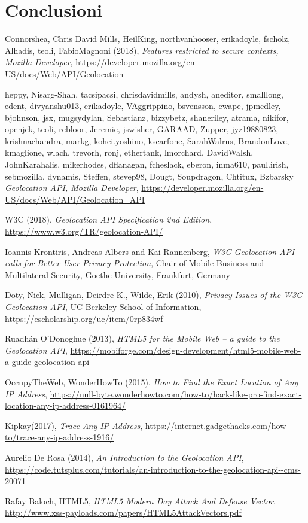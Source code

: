 \documentclass[11pt ,a4paper , twoside , openright ]{article}
\begin{document}
\section{Conclusioni}
\newpage
\listoffigures
\newpage
\begin{thebibliography}{99}
	\bibitem{}
	 Connorshea, Chris David Mills, HeilKing, northvanhooser, erikadoyle, fscholz, Alhadis, teoli, FabioMagnoni (2018),
	 \emph{Features restricted to secure contexts, Mozilla Developer},
	\url{https://developer.mozilla.org/en-US/docs/Web/API/Geolocation}
	
	\bibitem{}
	heppy, Nisarg-Shah, tacsipacsi, chrisdavidmills, andysh, aneditor, smalllong, edent, divyanshu013, erikadoyle, VAggrippino, bsvensson, ewape, jpmedley, bjohnson, jsx, mugsydylan, Sebastianz, bizzybetz, shaneriley, atrama, nikifor, openjck, teoli, rebloor, Jeremie, jswisher, GARAAD, Zupper, jyz19880823, krishnachandra, markg, kohei.yoshino, kscarfone, SarahWalrus, BrandonLove, kmaglione, wlach, trevorh, ronj, ethertank, lmorchard, DavidWalsh, JohnKarahalis, mikerhodes, dflanagan, fcheslack, eberon, inma610, paul.irish, sebmozilla, dynamis, Steffen, stevep98, Dougt, Soupdragon, Chtitux, Bzbarsky
	\emph{Geolocation API, Mozilla Developer},
	\url{https://developer.mozilla.org/en-US/docs/Web/API/Geolocation_API}
	
	\bibitem{}
	W3C (2018), 
	\emph{Geolocation API Specification 2nd Edition},
	\url{https://www.w3.org/TR/geolocation-API/}
	
	\bibitem{}
	Ioannis Krontiris, Andreas Albers and Kai Rannenberg,
	\emph{W3C Geolocation API calls for
		Better User Privacy Protection}, 
	Chair of Mobile Business and Multilateral Security, Goethe University, Frankfurt, Germany
	
	\bibitem{}
	Doty, Nick, Mulligan, Deirdre K., Wilde, Erik (2010),
	\emph{Privacy Issues of the W3C Geolocation API}, UC Berkeley School of Information, \url{https://escholarship.org/uc/item/0rp834wf}
	
	\bibitem{}
	Ruadhán O'Donoghue (2013),
	\emph{HTML5 for the Mobile Web – a guide to the Geolocation API}, \url{https://mobiforge.com/design-development/html5-mobile-web-a-guide-geolocation-api}

	\bibitem{}
	OccupyTheWeb, WonderHowTo (2015),
	\emph{How to Find the Exact Location of Any IP Address}, \url{https://null-byte.wonderhowto.com/how-to/hack-like-pro-find-exact-location-any-ip-address-0161964/}
	
	\bibitem{}
	Kipkay(2017), 
	\emph{Trace Any IP Address}, \url{https://internet.gadgethacks.com/how-to/trace-any-ip-address-1916/}
	
	\bibitem{}
	Aurelio De Rosa (2014),
	\emph{An Introduction to the Geolocation API},
	\url{https://code.tutsplus.com/tutorials/an-introduction-to-the-geolocation-api--cms-20071}
	
	\bibitem{}
	Rafay Baloch, HTML5,
	\emph{HTML5 Modern Day Attack And Defense Vector},
	\url{http://www.xss-payloads.com/papers/HTML5AttackVectors.pdf}
\end{thebibliography}
\end{document}

